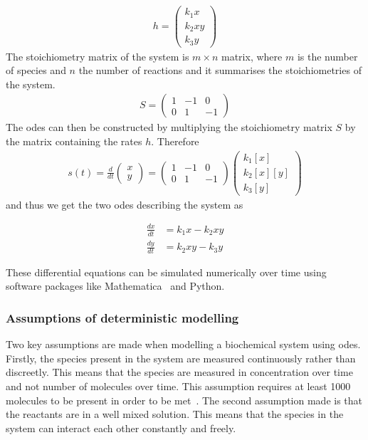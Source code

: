 \begin{align*}
h = 
\begin{pmatrix}
	k_{1}x \\
	 k_{2}xy \\
	 k_{3}y 
\end{pmatrix}
\end{align*}
The stoichiometry matrix of the system is $m\times n$ matrix, where $m$ is the number of species and $n$ the number of reactions and it summarises the stoichiometries of the system.  
\begin{align}
S = \begin{pmatrix}
	1 & -1& 0\\
	0&1&-1 
\end{pmatrix}
\end{align}
The \acrshort{ode}s can then be constructed by multiplying the stoichiometry matrix $S$ by the matrix containing the rates $h$. Therefore
\begin{align}
s(t) = \frac{d}{dt}\begin{pmatrix}
x\\
y 
\end{pmatrix} = \begin{pmatrix}
1 &-1  &0 \\ 
 0&1  &-1 
\end{pmatrix}\begin{pmatrix}
k_1[x]\\
k_2[x][y]\\
k_3[y] 
\end{pmatrix}
\end{align}
and thus we get the two \acrshort{ode}s describing the system as

\begin{align}
\frac{dx}{dt} &= k_1x - k_2xy\\ \label{eq:predator-prey}
\frac{dy}{dt} &= k_2xy - k_3y
\end{align}

\noindent These differential equations can be simulated numerically over time using software packages like Mathematica~\autocite{mathematica:2016} and Python.

\subsubsection{Assumptions of deterministic modelling}

Two key assumptions are made when modelling a biochemical system using \acrshort{ode}s. Firstly, the species present in the system are measured continuously rather than discreetly. This means that the species are measured in concentration over time and not number of molecules over time. This assumption requires at least 1000 molecules to be present in order to be met~\autocite{iglesias:2010}. The second assumption made is that the reactants are in a well mixed solution. This means that the species in the system can interact each other constantly and freely. 


